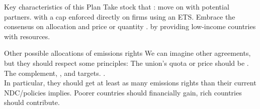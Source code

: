 \documentclass[aspectratio=169,xcolor=dvipsnames, 11pt,mathserif]{beamer}
\begin{document}
\begin{framefont}{\small}
\begin{frame}{Key characteristics of this Plan}
\bbsp \ip Take stock that : move on with potential partners.
\ip {} with a cap enforced directly on firms using an ETS.
\ip Embrace the consensus on  allocation and  price or quantity .
\ip {} by providing low-income countries with resources.%
\ee
\end{frame}


\begin{frame}{Other possible allocations of emissions rights}
    \bbsp \ip We can imagine other agreements, but they should respect some principles:
    \ip The union's quota or price should be . 
    \ip The  complement, ,  and targets.
    \ip {}. \\ In particular, they should get at least as many emissions rights than their current NDC/policies implies.
    \ip Poorer countries should financially gain, rich countries should contribute.
    \ee
\end{frame}


\end{framefont}
\end{document}
